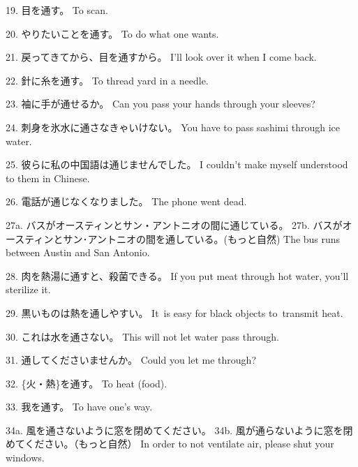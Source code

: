 \par{19. 目を通す。 \hfill\break
To scan. }

\par{20. やりたいことを通す。 \hfill\break
To do what one wants. }

\par{21. 戻ってきてから、目を通すから。 \hfill\break
I'll look over it when I come back. }

\par{22. 針に糸を通す。 \hfill\break
To thread yard in a needle. }

\par{23. 袖に手が通せるか。 \hfill\break
Can you pass your hands through your sleeves? }

\par{24. 刺身を氷水に通さなきゃいけない。 \hfill\break
You have to pass sashimi through ice water. }

\par{25. 彼らに私の中国語は通じませんでした。 \hfill\break
I couldn't make myself understood to them in Chinese. }

\par{26. 電話が通じなくなりました。 \hfill\break
The phone went dead. }

\par{27a. バスがオースティンとサン・アントニオの間に通じている。 \hfill\break
27b. バスがオースティンとサン･アントニオの間を通している。(もっと自然) \hfill\break
The bus runs between Austin and San Antonio. }

\par{28. 肉を熱湯に通すと、殺菌できる。 \hfill\break
If you put meat through hot water, you'll sterilize it. }

\par{29. 黒いものは熱を通しやすい。 \hfill\break
It is easy for black objects to transmit heat. }

\par{30. これは水を通さない。 \hfill\break
This will not let water pass through. }

\par{31. 通してくださいませんか。 \hfill\break
Could you let me through? }

\par{32. \{火・熱\}を通す。 \hfill\break
To heat (food). }

\par{33. 我を通す。 \hfill\break
To have one's way. }

\par{34a. 風を通さないように窓を閉めてください。 \hfill\break
34b. 風が通らないように窓を閉めてください。（もっと自然） \hfill\break
In order to not ventilate air, please shut your windows. }

